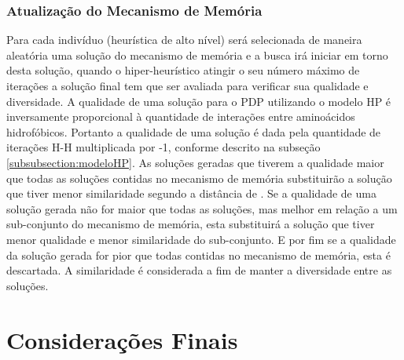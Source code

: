 


\subsubsection{Atualização do Mecanismo de Memória}
Para cada indivíduo (heurística de alto nível) será selecionada de maneira aleatória uma solução do mecanismo de memória e a busca irá iniciar em torno desta solução, quando o  hiper-heurístico atingir o seu número máximo de iterações a solução final tem que ser avaliada para verificar sua qualidade e diversidade. A qualidade de uma solução para o PDP utilizando o modelo HP é inversamente proporcional à quantidade de interações entre aminoácidos hidrofóbicos. Portanto a qualidade de uma solução é dada pela quantidade de iterações H-H multiplicada por -1, conforme descrito na subseção \ref{subsubsection:modeloHP}.  As soluções geradas que tiverem a qualidade maior que todas as soluções contidas no mecanismo de memória substituirão a solução que tiver menor similaridade segundo a distância de  \cite{hamming1950error}. Se a qualidade de uma solução gerada não for maior que todas as soluções, mas melhor em relação a um sub-conjunto do mecanismo de memória, esta substituirá a solução que tiver menor qualidade e menor similaridade do sub-conjunto. E por fim se a qualidade da solução gerada for pior que todas contidas no mecanismo de memória, esta é descartada. A similaridade é considerada a fim de manter a diversidade entre as soluções.  



\section{Considerações Finais}
\label{Metodologia:ConsideracoesFinais}

